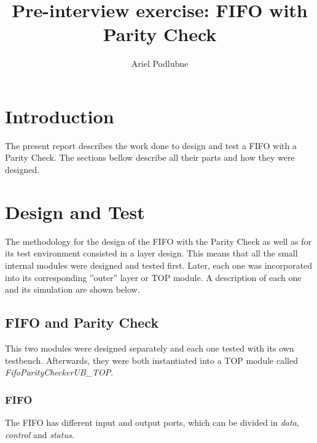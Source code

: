 \documentclass[12pt]{article}
\begin{document}
 

\newcommand{\newtext}[1]{\textcolor[rgb]{0.55,0.47,0.06}{#1}}

\newcommand{\mytext}[1]{{\normalfont{\textit{#1}}}}
\newcommand{\fifo}{FIFO\xspace}
\newcommand{\paritycheck}{Parity Check\xspace}
\newcommand{\vhdl}{VHDL\xspace}


\title{Pre-interview exercise: FIFO with Parity Check}
\author{Ariel Podlubne}
\maketitle
 
\section{Introduction}
The present report describes the work done to design and test a \fifo with a \paritycheck. The sections bellow describe all their parts and how they were designed.
 
\section{Design and Test}
The methodology for the design of the \fifo with the \paritycheck as well as for its test environment consisted in a layer design. This means that all the small internal modules were designed and tested first. Later, each one was incorporated into its corresponding ''outer''  layer or TOP module.  A description of each one and its simulation are shown below.

\subsection{\fifo and \paritycheck}
\label{sec:fifo and paritycheck}
This two modules were designed separately and each one tested with its own testbench.  Afterwards, they were both instantiated into a TOP module called \textit{FifoParityCheckerUB\_TOP}.

\subsubsection{\fifo}
\label{subsubsection: Fifo}
The \fifo has different input and output  ports, which can be divided in \textit{data}, \textit{control} and \textit{status}.
\end{document}

